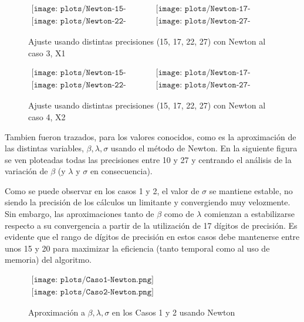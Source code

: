 \begin{figure} [H]
$\begin{array}{cc}
\texttt{[image: plots/Newton-15-caso3.png]} &
\texttt{[image: plots/Newton-17-caso3.png]} \\
\texttt{[image: plots/Newton-22-caso3.png]} &
\texttt{[image: plots/Newton-27-caso3.png]}
\end{array}$
\caption{Ajuste usando distintas precisiones (15, 17, 22, 27) con Newton al caso 3, X1}
\label{fig:FitCaso3Newton}
\end{figure}

\begin{figure} [H]
$\begin{array}{cc}
\texttt{[image: plots/Newton-15-caso4.png]} &
\texttt{[image: plots/Newton-17-caso4.png]} \\
\texttt{[image: plots/Newton-22-caso4.png]} &
\texttt{[image: plots/Newton-27-caso4.png]}
\end{array}$
\caption{Ajuste usando distintas precisiones (15, 17, 22, 27) con Newton al caso 4, X2}
\label{fig:FitCaso4Newton}
\end{figure}


Tambien fueron trazados, para los valores conocidos, como es la 
aproximaci\'on de las distintas variables, $\beta, \lambda, \sigma$ usando el 
m\'etodo de Newton. En la siguiente figura se ven ploteadas todas las 
precisiones entre 10 y 27 y centrando el an\'alisis de la variaci\'on de 
$\beta$ (y $\lambda$ y $\sigma$ en consecuencia).

Como se puede observar en los casos 1 y 2, el valor de $\sigma$ se mantiene 
estable, no siendo la precisi\'on de los c\'alculos un limitante y convergiendo 
muy velozmente. Sin embargo, las aproximaciones tanto de $\beta$ como de 
$\lambda$ comienzan a estabilizarse respecto a su convergencia a partir de la 
utilizaci\'on de 17 d\'igitos de precisi\'on. Es evidente que el rango de 
d\'igitos de precisi\'on en estos casos debe mantenerse entre unos 15 y 20 
para maximizar la eficiencia (tanto temporal como al uso de memoria) del 
algoritmo.  

\begin{figure}
$\begin{array}{c}
\texttt{[image: plots/Caso1-Newton.png]} \\
\texttt{[image: plots/Caso2-Newton.png]}
\end{array}$

\caption{Aproximaci\'on a $\beta, \lambda, \sigma$ en los Casos 1 y 2 
usando Newton}
\end{figure}

